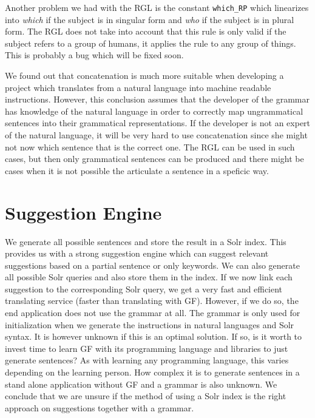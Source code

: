 Another problem we had with the RGL is the constant \texttt{which\_RP} which linearizes into \emph{which} if the subject is in singular form and \emph{who} if the subject is in plural form. The RGL does not take into account that this rule is only valid if the subject refers to a group of humans, it applies the rule to any group of things. This is probably a bug which will be fixed soon.

We found out that concatenation is much more suitable when developing a project which translates from a natural language into machine readable instructions. However, this conclusion assumes that the developer of the grammar has knowledge of the natural language in order to correctly map ungrammatical sentences into their grammatical representations. If the developer is not an expert of the natural language, it will be very hard to use concatenation since she might not now which sentence that is the correct one. The RGL can be used in such cases, but then only grammatical sentences can be produced and there might be cases when it is not possible the articulate a sentence in a speficic way.

\section{Suggestion Engine}
We generate all possible sentences and store the result in a Solr index. This provides us with a strong suggestion engine which can suggest relevant suggestions based on a partial sentence or only keywords. We can also generate all possible Solr queries and also store them in the index. If we now link each suggestion to the corresponding Solr query, we get a very fast and efficient translating service (faster than translating with GF). However, if we do so, the end application does not use the grammar at all. The grammar is only used for initialization when we generate the instructions in natural languages and Solr syntax. It is however unknown if this is an optimal solution. If so, is it worth to invest time to learn GF with its programming language and libraries to just generate sentences? As with learning any programming language, this varies depending on the learning person. How complex it is to generate sentences in a stand alone application without GF and a grammar is also unknown.
\newline
\newline
We conclude that we are unsure if the method of using a Solr index is the right approach on suggestions together with a grammar. 

